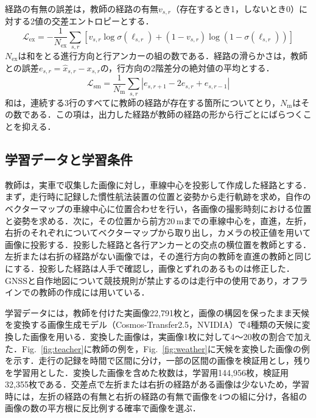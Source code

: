 経路の有無の誤差は，教師の経路の有無$v_{s,r}$（存在するとき1，しないとき0）に対する2値の交差エントロピーとする．
\begin{equation}
  \mathcal{L}_{\mathrm{ex}} = -\frac{1}{N_{\mathrm{ex}}}\sum_{s,r}\left[v_{s,r}\log\sigma(\ell_{s,r}) + (1-v_{s,r})\log\left(1-\sigma(\ell_{s,r})\right)\right]
  \label{eq:loss_ex}
\end{equation}
$N_{\mathrm{ex}}$は和をとる進行方向と行アンカーの組の数である．経路の滑らかさは，教師との誤差$e_{s,r}=\hat{x}_{s,r}-x_{s,r}$の，行方向の2階差分の絶対値の平均とする．
\begin{equation}
  \mathcal{L}_{\mathrm{sm}} = \frac{1}{N_{\mathrm{m}}}\sum_{s,r}\left|e_{s,r+1}-2e_{s,r}+e_{s,r-1}\right|
  \label{eq:loss_sm}
\end{equation}
和は，連続する3行のすべてに教師の経路が存在する箇所についてとり，$N_{\mathrm{m}}$はその数である．この項は，出力した経路が教師の経路の形から行ごとにばらつくことを抑える．

\subsection{学習データと学習条件}
\label{sec:training}
教師は，実車で収集した画像に対し，車線中心を投影して作成した経路とする．まず，走行時に記録した慣性航法装置の位置と姿勢から走行軌跡を求め，自作のベクターマップの車線中心に位置合わせを行い，各画像の撮影時刻における位置と姿勢を求める．次に，その位置から前方20\,mまでの車線中心を，直進，左折，右折のそれぞれについてベクターマップから取り出し，カメラの校正値を用いて画像に投影する．投影した経路と各行アンカーとの交点の横位置を教師とする．左折または右折の経路がない画像では，その進行方向の教師を直進の教師と同じにする．投影した経路は人手で確認し，画像とずれのあるものは修正した．GNSSと自作地図について競技規則が禁止するのは走行中の使用であり，オフラインでの教師の作成には用いている．

学習データには，教師を付けた実画像22{,}791枚と，画像の構図を保ったまま天候を変換する画像生成モデル（Cosmos-Transfer2.5，NVIDIA）で4種類の天候に変換した画像を用いる．変換した画像は，実画像1枚に対して4〜20枚の割合で加えた．Fig.~\ref{fig:teacher}に教師の例を，Fig.~\ref{fig:weather}に天候を変換した画像の例を示す．走行の記録を時間で区間に分け，一部の区間の画像を検証用とし，残りを学習用とした．変換した画像を含めた枚数は，学習用144{,}956枚，検証用32{,}355枚である．交差点で左折または右折の経路がある画像は少ないため，学習時には，左折の経路の有無と右折の経路の有無で画像を4つの組に分け，各組の画像の数の平方根に反比例する確率で画像を選ぶ．

